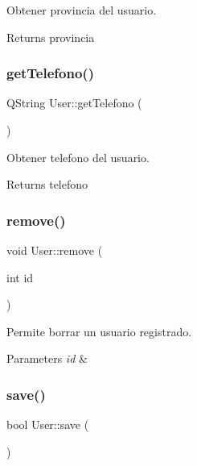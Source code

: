 Obtener provincia del usuario. 

\begin{DoxyReturn}{Returns}
provincia 
\end{DoxyReturn}
\mbox{\label{classUser_a94361359fc402cecf21f3ac7189121d7}} 
\subsubsection{\texorpdfstring{get\+Telefono()}{getTelefono()}}
{\footnotesize\ttfamily Q\+String User\+::get\+Telefono (\begin{DoxyParamCaption}{ }\end{DoxyParamCaption})}



Obtener telefono del usuario. 

\begin{DoxyReturn}{Returns}
telefono 
\end{DoxyReturn}
\mbox{\label{classUser_a7c4b278350236406ce9dcd6b8f707f47}} 
\subsubsection{\texorpdfstring{remove()}{remove()}}
{\footnotesize\ttfamily void User\+::remove (\begin{DoxyParamCaption}\item[{int}]{id }\end{DoxyParamCaption})\hspace{0.3cm}{\ttfamily [static]}}



Permite borrar un usuario registrado. 


\begin{DoxyParams}{Parameters}
{\em id} & \\
\hline
\end{DoxyParams}
\mbox{\label{classUser_a6bc3635e377a3d934379add410fcf9c0}} 
\subsubsection{\texorpdfstring{save()}{save()}}
{\footnotesize\ttfamily bool User\+::save (\begin{DoxyParamCaption}{ }\end{DoxyParamCaption})}



